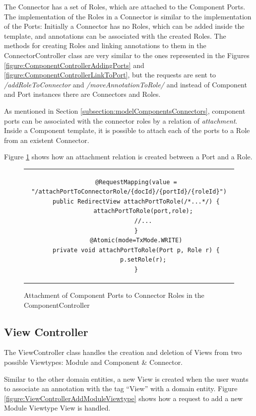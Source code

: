 The Connector has a set of Roles, which are attached to the Component Ports. The implementation of the Roles in a Connector is similar to the implementation of the Ports: Initially a Connector has no Roles, which can be added inside the template, and annotations can be associated with the created Roles. The methods for creating Roles and linking annotations to them in the ConnectorController class are very similar to the ones represented in the Figures \ref{figure:ComponentControllerAddingPorts} and \ref{figure:ComponentControllerLinkToPort}, but the requests are sent to \textit{/addRoleToConnector} and \textit{/moveAnnotationToRole/} and instead of Component and Port instances there are Connectors and Roles.

As mentioned in Section \ref{subsection:modelComponentsConnectors}, component ports can be associated with the connector roles by a relation of \textit{attachment}. Inside a Component template, it is possible to attach each of the ports to a Role from an existent Connector.

Figure \ref{figure:ComponentControllerAttachment} shows how an attachment relation is created between a Port and a Role.

\begin{figure}[h]
\centering
\lstset{style=customjava}
\begin{tabular}{c}
\begin{lstlisting}
	@RequestMapping(value = "/attachPortToConnectorRole/{docId}/{portId}/{roleId}")
	public RedirectView attachPortToRole(/*...*/) {
		attachPortToRole(port,role);
		//...
	}
	@Atomic(mode=TxMode.WRITE)
	private void attachPortToRole(Port p, Role r) {
		p.setRole(r);
	}
\end{lstlisting}
\end{tabular}
\caption{Attachment of Component Ports to Connector Roles in the ComponentController}
\label{figure:ComponentControllerAttachment}
\end{figure}

\subsection{View Controller}
\label{substection:viewController}
The ViewController class handles the creation and deletion of Views from two possible Viewtypes: Module and Component \& Connector. 

Similar to the other domain entities, a new View is created when the user wants to associate an annotation with the tag ``View'' with a domain entity. Figure \ref{figure:ViewControllerAddModuleViewtype} shows how a request to add a new Module Viewtype View is handled.

